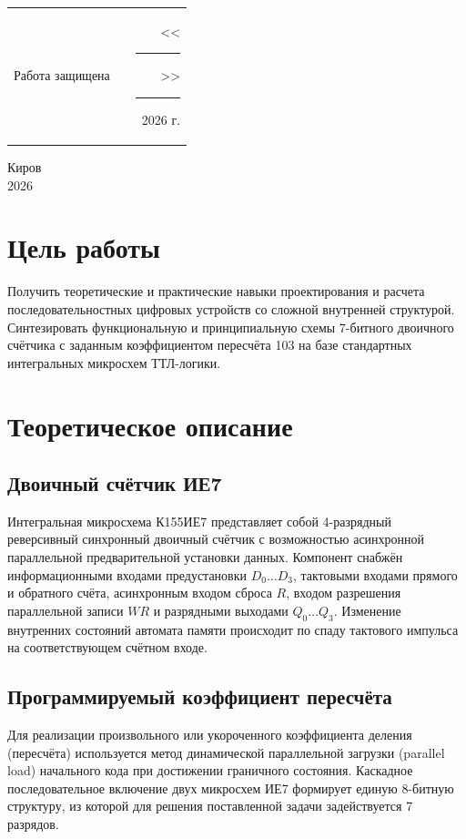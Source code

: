 \documentclass[oneside,a4paper,14pt]{extarticle}
\begin{document}
\noindent
\begin{tabular}{lp{58mm}r}
  Работа защищена &  & \hspace{5mm}<<\rule[-1mm]{5mm}{0.10mm}\/>>\rule[-1mm]{30mm}{0.10mm}\ 2026 г.
\end{tabular}
\vfill

\begin{center}
  Киров\\
  2026
\end{center}

\newpage\thispagestyle{plain}

\section{Цель работы}
Получить теоретические и практические навыки проектирования и расчета последовательностных цифровых устройств со сложной внутренней структурой. Синтезировать функциональную и принципиальную схемы 7-битного двоичного счётчика с заданным коэффициентом пересчёта 103 на базе стандартных интегральных микросхем ТТЛ-логики.

\section{Теоретическое описание}
\subsection{Двоичный счётчик ИЕ7}
Интегральная микросхема К155ИЕ7 представляет собой 4-разрядный реверсивный синхронный двоичный счётчик с возможностью асинхронной параллельной предварительной установки данных. Компонент снабжён информационными входами предустановки $D_0\dots D_3$, тактовыми входами прямого и обратного счёта, асинхронным входом сброса $R$, входом разрешения параллельной записи $WR$ и разрядными выходами $Q_0\dots Q_3$. Изменение внутренних состояний автомата памяти происходит по спаду тактового импульса на соответствующем счётном входе.

\subsection{Программируемый коэффициент пересчёта}
Для реализации произвольного или укороченного коэффициента деления (пересчёта) используется метод динамической параллельной загрузки (parallel load) начального кода при достижении граничного состояния. Каскадное последовательное включение двух микросхем ИЕ7 формирует единую 8-битную структуру, из которой для решения поставленной задачи задействуется 7 разрядов. 
\end{document}
